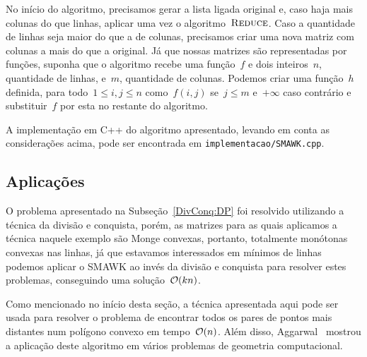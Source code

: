 No início do algoritmo, precisamos gerar a lista ligada original e, caso haja mais colunas do que linhas, aplicar uma vez o algoritmo~$\textsc{Reduce}$. Caso a quantidade de linhas seja maior do que a de colunas, precisamos criar uma nova matriz com colunas a mais do que a original. Já que nossas matrizes são representadas por funções, suponha que o algoritmo recebe uma função~$f$ e dois inteiros~$n$, quantidade de linhas, e~$m$, quantidade de colunas. Podemos criar uma função~$h$ definida, para todo~$1 \leq i,j \leq n$ como~$f(i,j)$ se~$j \leq m$ e~$+\infty$ caso contrário e substituir~$f$ por esta no restante do algoritmo.

A implementação em C++ do algoritmo apresentado, levando em conta as considerações acima, pode ser encontrada em \texttt{implementacao/SMAWK.cpp}.


\subsection{Aplicações} \label{SMAWK:Appl}
O problema apresentado na Subseção~\ref{DivConq:DP} foi resolvido utilizando a técnica da divisão e conquista, porém, as matrizes para as quais aplicamos a técnica naquele exemplo são Monge convexas, portanto, totalmente monótonas convexas nas linhas, já que estavamos interessados em mínimos de linhas podemos aplicar o SMAWK ao invés da divisão e conquista para resolver estes problemas, conseguindo uma solução~$\mathcal{O}(kn)$.  

Como mencionado no início desta seção, a técnica apresentada aqui pode ser usada para resolver o problema de encontrar todos os pares de pontos mais distantes num polígono convexo em tempo~$\mathcal{O}(n)$. Além disso, Aggarwal~\cite{Aggarwal:1987} mostrou a aplicação deste algoritmo em vários problemas de geometria computacional.
